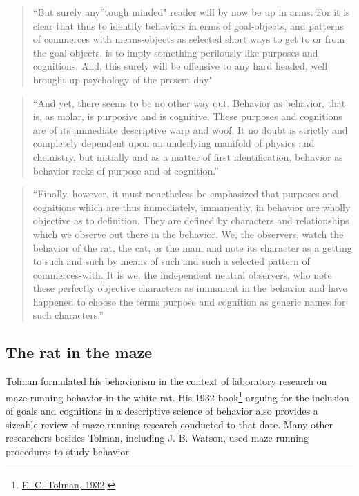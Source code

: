 \documentclass[
  oneside,
  12pt]{crumpbook}
\begin{document}
\begin{quote}
``But surely any''tough minded" reader will by now be up in arms. For it is clear that thus to identify behaviors in erms of goal-objects, and patterns of commerces with means-objects as selected short ways to get to or from the goal-objects, is to imply something perilously like purposes and cognitions. And, this surely will be offensive to any hard headed, well brought up psychology of the present day"
\end{quote}

\begin{quote}
``And yet, there seems to be no other way out. Behavior as behavior, that is, as molar, is purposive and is cognitive. These purposes and cognitions are of its immediate descriptive warp and woof. It no doubt is strictly and completely dependent upon an underlying manifold of physics and chemistry, but initially and as a matter of first identification, behavior as behavior reeks of purpose and of cognition.''
\end{quote}

\begin{quote}
``Finally, however, it must nonetheless be emphasized that purposes and cognitions which are thus immediately, immanently, in behavior are wholly objective as to definition. They are defined by characters and relationships which we observe out there in the behavior. We, the observers, watch the behavior of the rat, the cat, or the man, and note its character as a getting to such and such by means of such and such a selected pattern of commerces-with. It is we, the independent neutral observers, who note these perfectly objective characters as immanent in the behavior and have happened to choose the terms purpose and cognition as generic names for such characters.''
\end{quote}

\hypertarget{the-rat-in-the-maze}{%
\subsection{The rat in the maze}\label{the-rat-in-the-maze}}

Tolman formulated his behaviorism in the context of laboratory research on maze-running behavior in the white rat. His 1932 book\footnote{\protect\hyperlink{ref-tolmanPurposiveBehaviorAnimal1932}{E. C. Tolman, 1932}.} arguing for the inclusion of goals and cognitions in a descriptive science of behavior also provides a sizeable review of maze-running research conducted to that date. Many other researchers besides Tolman, including J. B. Watson, used maze-running procedures to study behavior.
\end{document}
